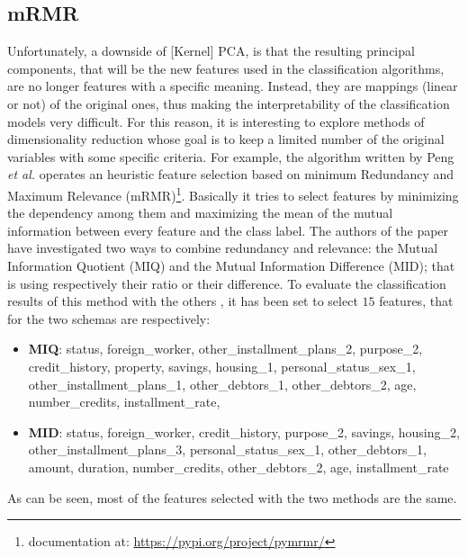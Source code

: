 \documentclass[letterpaper]{article}
\begin{document}
	\subsection{mRMR}
	\par Unfortunately, a downside of [Kernel] PCA, is that the resulting principal components, that will be the new features used in the classification algorithms, are no longer features with a specific meaning. Instead, they are mappings (linear or not) of the original ones, thus making the interpretability of the classification models very difficult. For this reason, it is interesting to explore methods of dimensionality reduction whose goal is to keep a limited number of the original variables with some specific criteria. For example, the algorithm written by Peng \emph{et al.}\cite{Peng05featureselection} operates an heuristic feature selection based on minimum Redundancy and Maximum Relevance (mRMR)\footnote{documentation at: \url{https://pypi.org/project/pymrmr/}}. Basically it tries to select features by minimizing the dependency among them and maximizing the mean of the mutual information between every feature and the class label. The authors of the paper have investigated two ways to combine redundancy and relevance: the Mutual Information Quotient (MIQ) and the Mutual Information Difference (MID); that is using respectively their ratio or their difference. To evaluate the classification results of this method with the others %
	, it has been set to select $15$ features, that for the two schemas are respectively:
	\begin{itemize}
		\item \textbf{MIQ}: status, foreign\_worker, other\_installment\_plans\_2, purpose\_2, credit\_history, property, savings, housing\_1, personal\_status\_sex\_1, other\_installment\_plans\_1, other\_debtors\_1, other\_debtors\_2, age, number\_credits, installment\_rate,
		\item \textbf{MID}: status, foreign\_worker, credit\_history, purpose\_2, savings, housing\_2, other\_installment\_plans\_3, personal\_status\_sex\_1, other\_debtors\_1, amount, duration, number\_credits, other\_debtors\_2, age, installment\_rate
	\end{itemize}
	As can be seen, most of the features selected with the two methods are the same.
\end{document}
